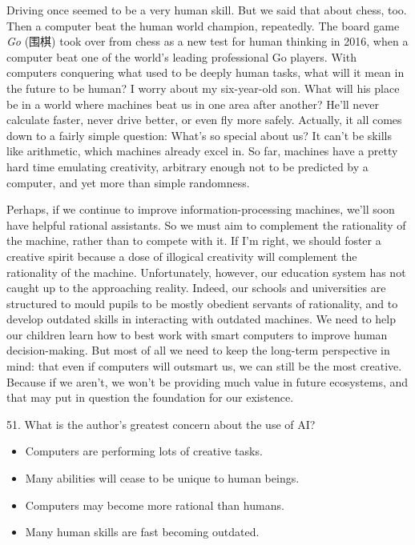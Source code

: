 \documentclass[UTF8,11pt]{ctexart}
\begin{document}
Driving once seemed to be a very human skill. But we said that about chess, too. Then a computer beat the human world champion, repeatedly. The board game\textit{ Go} (围棋) took over from chess as a new test for human thinking in 2016, when a computer beat one of the world’s leading professional Go players. With computers conquering what used to be deeply human tasks, what will it mean in the future to be human? I worry about my six-year-old son. What will his place be in a world where machines beat us in one area after another? He’ll never calculate faster, never drive better, or even fly more safely. Actually, it all comes down to a fairly simple question: What’s so special about us? It can’t be skills like arithmetic, which machines already excel in. So far, machines have a pretty hard time emulating creativity, arbitrary enough not to be predicted by a computer, and yet more than simple randomness.


Perhaps, if we continue to improve information-processing machines, we’ll soon have helpful rational assistants. So we must aim to complement the rationality of the machine, rather than to compete with it. If I'm right, we should foster a creative spirit because a dose of illogical creativity will complement the rationality of the machine. Unfortunately, however, our education system has not caught up to the approaching reality. Indeed, our schools and universities are structured to mould pupils to be mostly obedient servants of rationality, and to develop outdated skills in interacting with outdated machines. We need to help our children learn how to best work with smart computers to improve human decision-making. But most of all we need to keep the long-term perspective in mind: that even if computers will outsmart us, we can still be the most creative. Because if we aren’t, we won’t be providing much value in future ecosystems, and that may put in question the foundation for our existence.


51. What is the author’s greatest concern about the use of AI?


\begin{itemize}[leftmargin=2em,itemsep=.2em,topsep=.4em]\item[A.] Computers are performing lots of creative tasks.
\item[B.] Many abilities will cease to be unique to human beings.
\item[C.] Computers may become more rational than humans.
\item[D.] Many human skills are fast becoming outdated.
\end{itemize}
\end{document}
